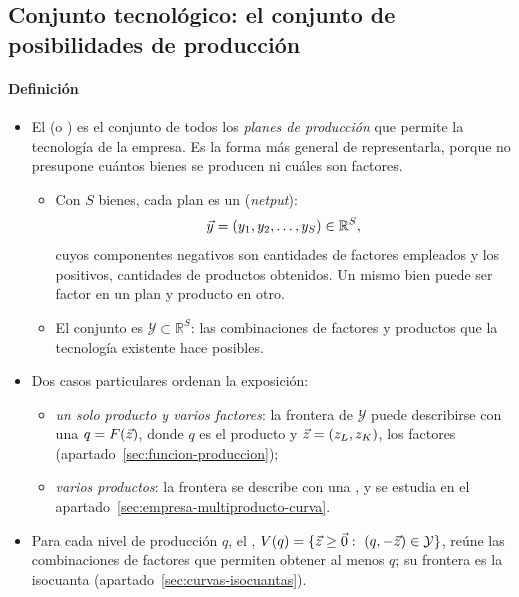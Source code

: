 \documentclass[11pt]{article}
\begin{document}
\subsection{Conjunto tecnológico: el conjunto de posibilidades de producción}\label{sec:conjunto-tecnologico-conjunto}

\paragraph{Definición}

\begin{itemize}
\item El  (o ) es el conjunto de todos los \emph{planes de producción} que permite la tecnología de la empresa. Es la forma más general de representarla, porque no presupone cuántos bienes se producen ni cuáles son factores\nocite{MasColellWhinstonGreen1995}.
  \begin{itemize}
  \item Con $S$ bienes, cada plan es un  (\emph{netput}):
    \begin{equation}
    \vec{y}=(y_1,y_2,\dots,y_S)\in\mathbb{R}^S, \label{eq:netput}
    \end{equation}
    cuyos componentes negativos son cantidades de factores empleados y los positivos, cantidades de productos obtenidos. Un mismo bien puede ser factor en un plan y producto en otro.
  \item El conjunto es $\mathcal{Y}\subset\mathbb{R}^S$: las combinaciones de factores y productos que la tecnología existente hace posibles.
  \end{itemize}
\item Dos casos particulares ordenan la exposición:
  \begin{itemize}
  \item \emph{un solo producto y varios factores}: la frontera de $\mathcal{Y}$ puede describirse con una  $q=F(\vec{z})$, donde $q$ es el producto y $\vec{z}=(z_L,z_K)$, los factores (apartado~\ref{sec:funcion-produccion});
  \item \emph{varios productos}: la frontera se describe con una , y se estudia en el apartado~\ref{sec:empresa-multiproducto-curva}.
  \end{itemize}
\item Para cada nivel de producción $q$, el , $V(q)=\{\vect{z}\geq\vect{0}:\ (q,-\vect{z})\in\mathcal{Y}\}$, reúne las combinaciones de factores que permiten obtener al menos $q$; su frontera es la isocuanta (apartado~\ref{sec:curvas-isocuantas})\nocite{Varian1992Microeconomic}.
\end{itemize}
\end{document}
